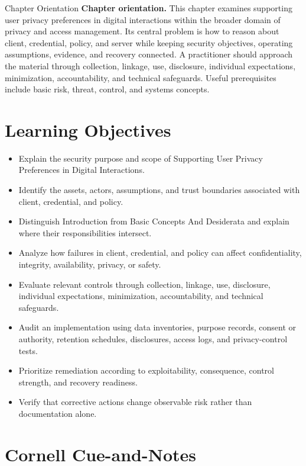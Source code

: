 \documentclass[11pt,letterpaper]{article}
\title{\CornellDocumentTitle}
\author{}
\date{}
\begin{document}
\maketitle
\begin{CornellOverviewBox}{Chapter Orientation}
\textbf{Chapter orientation.} This chapter examines supporting user privacy preferences in digital interactions within the broader domain of privacy and access management. Its central problem is how to reason about client, credential, policy, and server while keeping security objectives, operating assumptions, evidence, and recovery connected. A practitioner should approach the material through collection, linkage, use, disclosure, individual expectations, minimization, accountability, and technical safeguards. Useful prerequisites include basic risk, threat, control, and systems concepts.
\end{CornellOverviewBox}
\section*{Learning Objectives}
\begin{itemize}
\item Explain the security purpose and scope of Supporting User Privacy Preferences in Digital Interactions.
\item Identify the assets, actors, assumptions, and trust boundaries associated with client, credential, and policy.
\item Distinguish Introduction from Basic Concepts And Desiderata and explain where their responsibilities intersect.
\item Analyze how failures in client, credential, and policy can affect confidentiality, integrity, availability, privacy, or safety.
\item Evaluate relevant controls through collection, linkage, use, disclosure, individual expectations, minimization, accountability, and technical safeguards.
\item Audit an implementation using data inventories, purpose records, consent or authority, retention schedules, disclosures, access logs, and privacy-control tests.
\item Prioritize remediation according to exploitability, consequence, control strength, and recovery readiness.
\item Verify that corrective actions change observable risk rather than documentation alone.
\end{itemize}
\section*{Cornell Cue-and-Notes}
\end{document}

